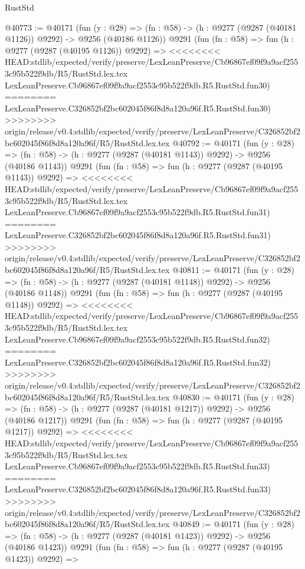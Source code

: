 \begin{lexlean}{RustStd}
\begin{coremodule}
{\begin{coremodule}
{{{{{{{{{{{{{{{{{{{{{{{{{{{{{{{{{{{{{{{{{{{{{{{{{{{{{{{@40773 := @40171
    (fun (y : @28) =>
    (fn : @58) -> (h : @9277 (@9287 (@40181 @1126)) @9292) -> @9256 (@40186 @1126))
    @9291
    (fun (fn : @58) =>
    fun (h : @9277 (@9287 (@40195 @1126)) @9292) =>
<<<<<<<< HEAD:stdlib/expected/verify/preserve/LexLeanPreserve/Cb96867ef09f9a9acf2553c95b522f9db/R5/RustStd.lex.tex
    LexLeanPreserve.Cb96867ef09f9a9acf2553c95b522f9db.R5.RustStd.fun30)
========
    LexLeanPreserve.C326852bf2bc602045f86f8d8a120a96f.R5.RustStd.fun30)
>>>>>>>> origin/release/v0.4:stdlib/expected/verify/preserve/LexLeanPreserve/C326852bf2bc602045f86f8d8a120a96f/R5/RustStd.lex.tex
@40792 := @40171
    (fun (y : @28) =>
    (fn : @58) -> (h : @9277 (@9287 (@40181 @1143)) @9292) -> @9256 (@40186 @1143))
    @9291
    (fun (fn : @58) =>
    fun (h : @9277 (@9287 (@40195 @1143)) @9292) =>
<<<<<<<< HEAD:stdlib/expected/verify/preserve/LexLeanPreserve/Cb96867ef09f9a9acf2553c95b522f9db/R5/RustStd.lex.tex
    LexLeanPreserve.Cb96867ef09f9a9acf2553c95b522f9db.R5.RustStd.fun31)
========
    LexLeanPreserve.C326852bf2bc602045f86f8d8a120a96f.R5.RustStd.fun31)
>>>>>>>> origin/release/v0.4:stdlib/expected/verify/preserve/LexLeanPreserve/C326852bf2bc602045f86f8d8a120a96f/R5/RustStd.lex.tex
@40811 := @40171
    (fun (y : @28) =>
    (fn : @58) -> (h : @9277 (@9287 (@40181 @1148)) @9292) -> @9256 (@40186 @1148))
    @9291
    (fun (fn : @58) =>
    fun (h : @9277 (@9287 (@40195 @1148)) @9292) =>
<<<<<<<< HEAD:stdlib/expected/verify/preserve/LexLeanPreserve/Cb96867ef09f9a9acf2553c95b522f9db/R5/RustStd.lex.tex
    LexLeanPreserve.Cb96867ef09f9a9acf2553c95b522f9db.R5.RustStd.fun32)
========
    LexLeanPreserve.C326852bf2bc602045f86f8d8a120a96f.R5.RustStd.fun32)
>>>>>>>> origin/release/v0.4:stdlib/expected/verify/preserve/LexLeanPreserve/C326852bf2bc602045f86f8d8a120a96f/R5/RustStd.lex.tex
@40830 := @40171
    (fun (y : @28) =>
    (fn : @58) -> (h : @9277 (@9287 (@40181 @1217)) @9292) -> @9256 (@40186 @1217))
    @9291
    (fun (fn : @58) =>
    fun (h : @9277 (@9287 (@40195 @1217)) @9292) =>
<<<<<<<< HEAD:stdlib/expected/verify/preserve/LexLeanPreserve/Cb96867ef09f9a9acf2553c95b522f9db/R5/RustStd.lex.tex
    LexLeanPreserve.Cb96867ef09f9a9acf2553c95b522f9db.R5.RustStd.fun33)
========
    LexLeanPreserve.C326852bf2bc602045f86f8d8a120a96f.R5.RustStd.fun33)
>>>>>>>> origin/release/v0.4:stdlib/expected/verify/preserve/LexLeanPreserve/C326852bf2bc602045f86f8d8a120a96f/R5/RustStd.lex.tex
@40849 := @40171
    (fun (y : @28) =>
    (fn : @58) -> (h : @9277 (@9287 (@40181 @1423)) @9292) -> @9256 (@40186 @1423))
    @9291
    (fun (fn : @58) =>
    fun (h : @9277 (@9287 (@40195 @1423)) @9292) =>
}}}}}}}}}}}}}}}}}}}}}}}}}}}}}}}}}}}}}}}}}}}}}}}}}}}}}}}
\end{coremodule}}
\end{coremodule}
\end{lexlean}
